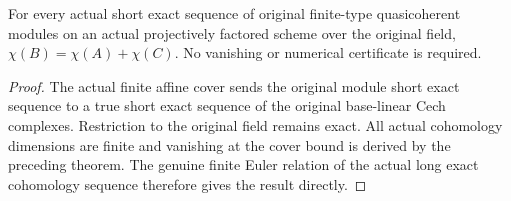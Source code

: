 \begin{theorem}
\label{thm:fc-scheme-coherent-euler-characteristic-exact}
\leanok
{}
For every actual short exact sequence of original finite-type
quasicoherent modules on an actual projectively factored scheme over
the original field, $\chi(B)=\chi(A)+\chi(C)$. No vanishing or numerical
certificate is required.
\end{theorem}
\begin{proof}
The actual finite affine cover sends the original module short exact
sequence to a true short exact sequence of the original base-linear
Cech complexes. Restriction to the original field remains exact. All
actual cohomology dimensions are finite and vanishing at the cover
bound is derived by the preceding theorem. The genuine finite Euler
relation of the actual long exact cohomology sequence therefore gives
the result directly.
\end{proof}
